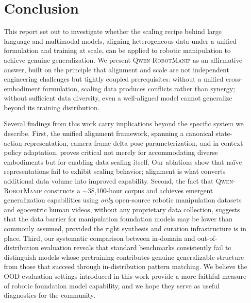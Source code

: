 \documentclass{article} %
\newcommand{\ours}{\textsc{Qwen-RobotManip}\xspace}
\begin{document}
\clearpage













\clearpage

\section{Conclusion}
\label{sec:conclusion}

This report set out to investigate whether the scaling recipe behind large language and multimodal models, aligning heterogeneous data under a unified formulation and training at scale, can be applied to robotic manipulation to achieve genuine generalization. We present \ours as an affirmative answer, built on the principle that alignment and scale are not independent engineering challenges but tightly coupled prerequisites: without a unified cross-embodiment formulation, scaling data produces conflicts rather than synergy; without sufficient data diversity, even a well-aligned model cannot generalize beyond its training distribution.

Several findings from this work carry implications beyond the specific system we describe. First, the unified alignment framework, spanning a canonical state-action representation, camera-frame delta pose parameterization, and in-context policy adaptation, proves critical not merely for accommodating diverse embodiments but for enabling data scaling itself. Our ablations show that na\"ive representations fail to exhibit scaling behavior; alignment is what converts additional data volume into improved capability. Second, the fact that \ours constructs a $\sim$38,100-hour corpus and achieves emergent generalization capabilities using \emph{only} open-source robotic manipulation datasets and egocentric human videos, without any proprietary data collection, suggests that the data barrier for manipulation foundation models may be lower than commonly assumed, provided the right synthesis and curation infrastructure is in place. Third, our systematic comparison between in-domain and out-of-distribution evaluation reveals that standard benchmarks consistently fail to distinguish models whose pretraining contributes genuine generalizable structure from those that succeed through in-distribution pattern matching. We believe the OOD evaluation settings introduced in this work provide a more faithful measure of robotic foundation model capability, and we hope they serve as useful diagnostics for the community.
\end{document}
